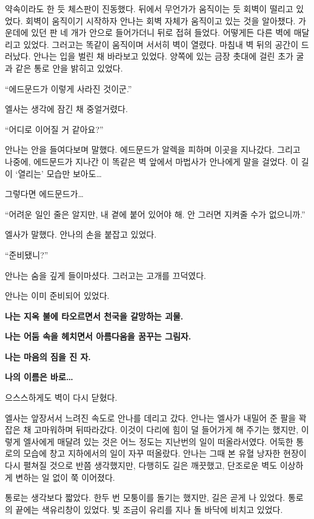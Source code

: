 약속이라도 한 듯 체스판이 진동했다. 뒤에서 무언가가 움직이는 듯 회벽이 떨리고 있었다. 회벽이 움직이기 시작하자 안나는 회벽 자체가 움직이고 있는 것을 알아챘다. 가운데에 있던 판 네 개가 안으로 들어가더니 뒤로 접혀 들었다. 어떻게든 다른 벽에 매달리고 있었다. 그러고는 똑같이 움직이며 서서히 벽이 열렸다. 마침내 벽 뒤의 공간이 드러났다. 안나는 입을 벌린 채 바라보고 있었다. 양쪽에 있는 금장 촛대에 걸린 초가 굴과 같은 통로 안을 밝히고 있었다.

``에드문드가 이렇게 사라진 것이군.''

엘사는 생각에 잠긴 채 중얼거렸다.

``어디로 이어질 거 같아요?''

안나는 안을 들여다보며 말했다. 에드문드가 알렉을 피하며 이곳을 지나갔다. 그리고 나중에, 에드문드가 지나간 이 똑같은 벽 앞에서 마법사가 안나에게 말을 걸었다. 이 길이 `열리는' 모습만 보아도\ldots

그렇다면 에드문드가\ldots

``어려운 일인 줄은 알지만, 내 곁에 붙어 있어야 해. 안 그러면 지켜줄 수가 없으니까.''

엘사가 말했다. 안나의 손을 붙잡고 있었다.

``준비됐니?''

안나는 숨을 깊게 들이마셨다. 그러고는 고개를 끄덕였다.

안나는 이미 준비되어 있었다.

\textbreak

\forceindent\textbf{나는 지옥 불에 타오르면서 천국을 갈망하는 괴물.}

\textbf{나는 어둠 속을 헤치면서 아름다움을 꿈꾸는 그림자.}

\textbf{나는 마음의 짐을 진 자.}

\textbf{나의 이름은 바로\ldots}

\textbreak

으스스하게도 벽이 다시 닫혔다.

엘사는 앞장서서 느려진 속도로 안나를 데리고 갔다. 안나는 엘사가 내밀어 준 팔을 꽉 잡은 채 고마워하며 뒤따라갔다. 이것이 다리에 힘이 덜 들어가게 해 주기는 했지만, 이렇게 엘사에게 매달려 있는 것은 어느 정도는 지난번의 일이 떠올라서였다. 어둑한 통로의 모습에 창고 지하에서의 일이 자꾸 떠올랐다. 안나는 그때 본 유혈 낭자한 현장이 다시 펼쳐질 것으로 반쯤 생각했지만, 다행히도 길은 깨끗했고, 단조로운 벽도 이상하게 변하는 일 없이 쭉 이어졌다.

통로는 생각보다 짧았다. 한두 번 모퉁이를 돌기는 했지만, 길은 곧게 나 있었다. 통로의 끝에는 색유리창이 있었다. 빛 조금이 유리를 지나 돌 바닥에 비치고 있었다.

